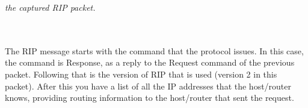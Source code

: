 \textit{the captured RIP packet.}

\\ \\ The RIP message starts with the command that the protocol issues. In this case, the command is Response, as a reply to the Request command of the previous packet. Following that is the version of RIP that is used (version 2 in this packet). After this you have a list of all the IP addresses that the host/router knows, providing routing information to the host/router that sent the request.